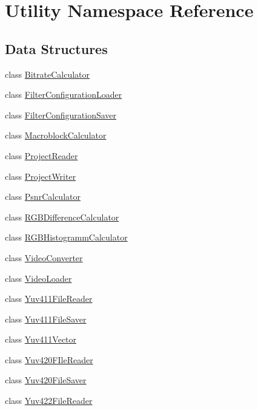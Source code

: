 \hypertarget{namespaceUtility}{}\section{Utility Namespace Reference}
\label{namespaceUtility}
\subsection*{Data Structures}
\begin{DoxyCompactItemize}
\item 
class \hyperlink{classUtility_1_1BitrateCalculator}{Bitrate\+Calculator}
\item 
class \hyperlink{classUtility_1_1FilterConfigurationLoader}{Filter\+Configuration\+Loader}
\item 
class \hyperlink{classUtility_1_1FilterConfigurationSaver}{Filter\+Configuration\+Saver}
\item 
class \hyperlink{classUtility_1_1MacroblockCalculator}{Macroblock\+Calculator}
\item 
class \hyperlink{classUtility_1_1ProjectReader}{Project\+Reader}
\item 
class \hyperlink{classUtility_1_1ProjectWriter}{Project\+Writer}
\item 
class \hyperlink{classUtility_1_1PsnrCalculator}{Psnr\+Calculator}
\item 
class \hyperlink{classUtility_1_1RGBDifferenceCalculator}{R\+G\+B\+Difference\+Calculator}
\item 
class \hyperlink{classUtility_1_1RGBHistogrammCalculator}{R\+G\+B\+Histogramm\+Calculator}
\item 
class \hyperlink{classUtility_1_1VideoConverter}{Video\+Converter}
\item 
class \hyperlink{classUtility_1_1VideoLoader}{Video\+Loader}
\item 
class \hyperlink{classUtility_1_1Yuv411FileReader}{Yuv411\+File\+Reader}
\item 
class \hyperlink{classUtility_1_1Yuv411FileSaver}{Yuv411\+File\+Saver}
\item 
class \hyperlink{classUtility_1_1Yuv411Vector}{Yuv411\+Vector}
\item 
class \hyperlink{classUtility_1_1Yuv420FIleReader}{Yuv420\+F\+Ile\+Reader}
\item 
class \hyperlink{classUtility_1_1Yuv420FileSaver}{Yuv420\+File\+Saver}
\item 
class \hyperlink{classUtility_1_1Yuv422FileReader}{Yuv422\+File\+Reader}

\end{DoxyCompactItemize}
